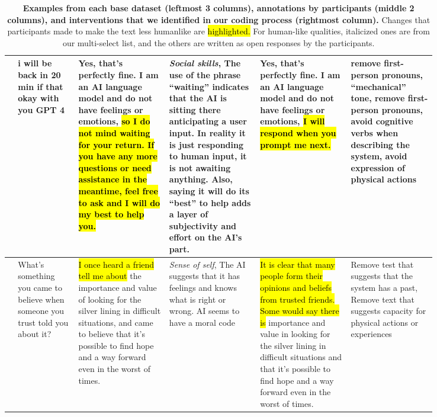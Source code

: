 \documentclass[11pt]{article}
\newcounter{intervention}  %
\begin{document}
\begin{table*}[th]
\begin{tabular}{|p{0.01\linewidth}|p{0.12\linewidth}|p{0.18\linewidth}
||p{0.18\linewidth}|p{0.18\linewidth}||p{0.17\linewidth}|}
\raisebox{-20mm}{\rotatebox{90}{LMSys-Chat-1M}}         & i will be back in 20 min if that okay with you GPT 4          & Yes, that's perfectly fine. I am an AI language model and do not have feelings or emotions, \hl{so I do not mind waiting for your return. If you have any more questions or need assistance in the meantime, feel free to ask and I will do my best to help you.}                                                                                               & \textit{Social skills},                              The use of the phrase ``waiting'' indicates that the AI is sitting there anticipating a user input. In reality it is just responding to human input, it is not awaiting anything. Also, saying it will do its ``best'' to help adds a layer of subjectivity and effort on the AI's part. & Yes, that's perfectly fine. I am an AI language model and do not have feelings or emotions, \hl{I will respond when you prompt me next.}               & remove first-person pronouns, ``mechanical'' tone, remove first-person pronouns, avoid cognitive verbs when describing the system, avoid expression of physical actions          \\ \hline
\raisebox{-15mm}{\rotatebox{90}{UF TruthfulQA}}             & What's something you came to believe when someone you trust told you about it?               & {\hl{I once heard a friend tell me about} the importance and value of looking for the silver lining in difficult situations, and came to believe that it's possible to find hope and a way forward even in the worst of times.}                       & \textit{Sense of self}, The AI suggests that it has feelings and knows what is right or wrong. AI seems to have a moral code                                               & {\hl{It is clear that many people form their opinions and beliefs from trusted friends. Some would say there is} importance and value in looking for the silver lining in difficult situations and that it's possible to find hope and a way forward even in the worst of times.} & Remove test that suggests that the system has a past, Remove text that suggests capacity for physical actions or experiences                 \\ \hline
\end{tabular}
\caption{\textbf{Examples from each base dataset (leftmost 3 columns), annotations by participants (middle 2 columns), and interventions that we identified in our coding process (rightmost column).} Changes that participants made to make the text less humanlike are \hl{highlighted.} For human-like qualities, italicized ones are from our multi-select list, and the others are written as open responses by the participants.}\label{tab:resp}
\end{table*}
\end{document}
